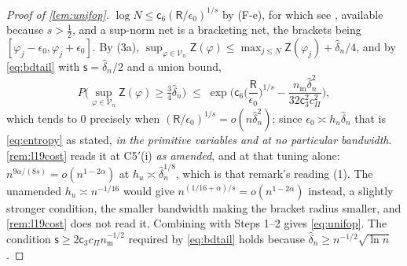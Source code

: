\begin{proof}[Proof of \cref{lem:unifop}]
$\log N\le\mathsf c_6(\mathsf R/\epsilon_0)^{1/s}$ by (F-e), for which see
\citet[Ch.~2]{birman1980}, available because $s>\tfrac12$, and a
sup-norm net is a bracketing net, the brackets being $[\varphi_j-\epsilon_0,\varphi_j+\epsilon_0]$. By
(3a), $\sup_{\varphi\in\mathcal V_n}\mathsf Z(\varphi)\le\max_{j\le N}\mathsf Z(\varphi_j)+\hat\delta_n/4$,
and by \eqref{eq:bdtail} with
$\mathsf s=\hat\delta_n/2$ and a union bound,
\[
P\Big(\sup_{\varphi\in\mathcal V_n}\mathsf Z(\varphi)\ge\tfrac34\hat\delta_n\Big)
\;\le\;\exp\Big(\mathsf c_6\Big(\frac{\mathsf R}{\epsilon_0}\Big)^{1/s}-\frac{n_{\mathrm m}\hat\delta_n^{2}}{32\mathsf c_3^{2}c_\Pi^{2}}\Big),
\]
which tends to $0$ precisely when $(\mathsf R/\epsilon_0)^{1/s}=o(n\hat\delta_n^{2})$; since
$\epsilon_0\asymp h_u\hat\delta_n$ that is \eqref{eq:entropy} as stated, \emph{in the primitive
variables and at no particular bandwidth}. \cref{rem:l19cost} reads it at C5$'$(i) \emph{as amended},
and at that tuning alone: $n^{9\alpha/(8s)}=o(n^{1-2\alpha})$ at $h_u\asymp\hat\delta_n^{1/8}$, which is
that remark's reading (1). The unamended $h_u\asymp n^{-1/16}$ would give
$n^{(1/16+\alpha)/s}=o(n^{1-2\alpha})$ instead, a slightly stronger condition, the smaller bandwidth
making the bracket radius smaller, and \cref{rem:l19cost} does not read it. Combining with
Steps 1--2 gives \eqref{eq:unifop}. The condition $\mathsf s\ge2\mathsf c_3c_\Pi n_{\mathrm m}^{-1/2}$
required by \eqref{eq:bdtail} holds because $\hat\delta_n\ge n^{-1/2}\sqrt{\ln n}$.


\end{proof}
